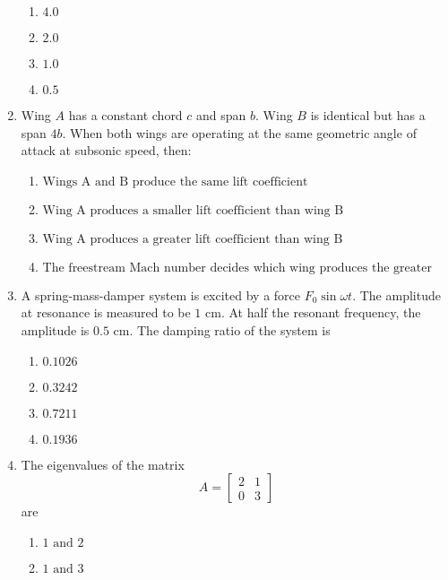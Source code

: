 \documentclass[journal]{IEEEtran}
\numberwithin{equation}{enumi}
\numberwithin{figure}{enumi}
\begin{document}
\begin{enumerate}
\begin{multicols}{2}
    \begin{enumerate}
        \item $ 4.0 $
        \item $ 2.0 $
        \item $ 1.0 $
        \item $ 0.5 $
    \end{enumerate}
\end{multicols}
\bigskip
\item Wing $A$ has a constant chord $c$ and span $b$. Wing $B$ is identical but has a span $4b$. When both wings are operating at the same geometric angle of attack at subsonic speed, then:
    \begin{enumerate}
        \item $ \text{Wings A and B produce the same lift coefficient} $
        \item $ \text{Wing A produces a smaller lift coefficient than wing B} $
        \item $ \text{Wing A produces a greater lift coefficient than wing B} $
        \item $ \text{The freestream Mach number decides which wing produces the greater lift coefficient} $
    \end{enumerate}
\bigskip
\item A spring-mass-damper system is excited by a force $F_0 \sin \omega t$. The amplitude at resonance is measured to be $1$ cm. At half the resonant frequency, the amplitude is $0.5$ cm. The damping ratio of the system is
\begin{multicols}{2}
    \begin{enumerate}
        \item $ 0.1026 $
        \item $ 0.3242 $
        \item $ 0.7211 $
        \item $ 0.1936 $
    \end{enumerate}
\end{multicols}
\bigskip
\item The eigenvalues of the matrix\[A = \begin{bmatrix} 2 & 1 \\0 & 3\end{bmatrix}\]are
\begin{multicols}{4}
    \begin{enumerate}
        \item $ \text{1 and 2} $
        \item $ \text{1 and 3} $

\end{enumerate}
\end{multicols}
\end{enumerate}
\end{document}
